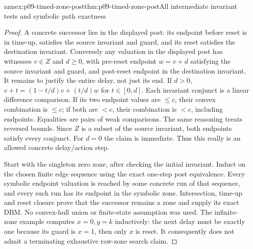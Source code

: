 \begin{annexitem}{annex:p09-timed-zone-post}{thm:p09-timed-zone-post}{All intermediate invariant tests and symbolic path exactness}
\begin{proof}
A concrete successor lies in the displayed post: its endpoint before
reset is in time-up, satisfies the source invariant and guard, and its
reset satisfies the destination invariant. Conversely any valuation in
the displayed post has witnesses \(v\in Z\) and \(d\geq0\), with
pre-reset endpoint \(w=v+d\) satisfying the source invariant and guard,
and post-reset endpoint in the destination invariant. It remains to
justify the entire delay, not just its end. If \(d>0\),
\(v+t=(1-t/d)v+(t/d)w\) for \(t\in[0,d]\). Each invariant
conjunct is a linear difference comparison. If its two endpoint values
are \(\leq c\), their convex combination is \(\leq c\); if both
are \(<c\), their combination is \(<c\), including endpoints.
Equalities are pairs of weak comparisons. The same reasoning treats
reversed bounds. Since \(Z\) is a subset of the source invariant, both
endpoints satisfy every conjunct. For \(d=0\) the claim is immediate.
Thus this really is an allowed concrete delay/action step.

Start with the singleton zero zone, after checking the initial invariant.
Induct on the chosen finite edge sequence using the exact one-step post
equivalence. Every symbolic endpoint valuation is reached by some
concrete run of that sequence, and every such run has its endpoint in
the symbolic zone. Intersection, time-up and reset closure prove that
the successor remains a zone and supply its exact DBM. No convex-hull
union or finite-state assumption was used. The infinite-zone example
computes \(x=0,y=k\) inductively: the next delay must be exactly one
because its guard is \(x=1\), then only \(x\) is reset. It consequently
does not admit a terminating exhaustive raw-zone search claim.
\end{proof}
\end{annexitem}

